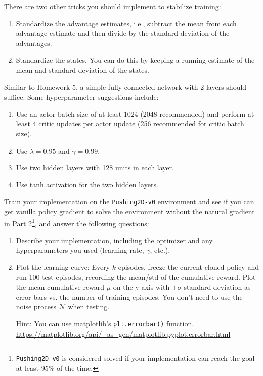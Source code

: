 \documentclass[12pt]{article}
\begin{document}
There are two other tricks you should implement to stabilize training:
\begin{enumerate}
    \item Standardize the advantage estimates, i.e., subtract the mean from each advantage estimate and then divide by the standard deviation of the advantages.  
    \item Standardize the states.  You can do this by keeping a running estimate of the mean and standard deviation of the states.
\end{enumerate}

Similar to Homework 5, a simple fully connected network with 2 layers should suffice.  Some hyperparameter suggestions include: 
\begin{enumerate}
    \item Use an actor batch size of at least 1024 (2048 recommended) and perform at least 4 critic updates per actor update (256 recommended for critic batch size).
    \item Use $\lambda=0.95$ and $\gamma=0.99$.
    \item Use two hidden layers with 128 units in each layer.
    \item Use tanh activation for the two hidden layers.
\end{enumerate}

Train your implementation on the \texttt{Pushing2D-v0} environment and see if you can get vanilla policy gradient to solve the environment without the natural gradient in Part 2\footnote{\texttt{Pushing2D-v0} is considered solved if your implementation can reach the goal at least 95\% of the time.}, and answer the following questions:

\begin{enumerate}
\item Describe your implementation, including the optimizer and any hyperparameters you used (learning rate, $\gamma$, etc.).
 \begin{solution}
\end{solution}
\item  Plot the learning curve: Every $k$ episodes, freeze the current cloned policy and run 100 test episodes, recording the mean/std of the cumulative reward. Plot the mean cumulative reward $\mu$ on the y-axis with $\pm \sigma$ standard deviation as error-bars vs. the number of training episodes.  You don't need to use the noise process $\mathcal{N}$ when testing.

Hint: You can use matplotlib's \texttt{plt.errorbar()} function. \url{https://matplotlib.org/api/\_as\_gen/matplotlib.pyplot.errorbar.html}
 \begin{solution}
\end{solution}
\end{enumerate}
\end{document}
